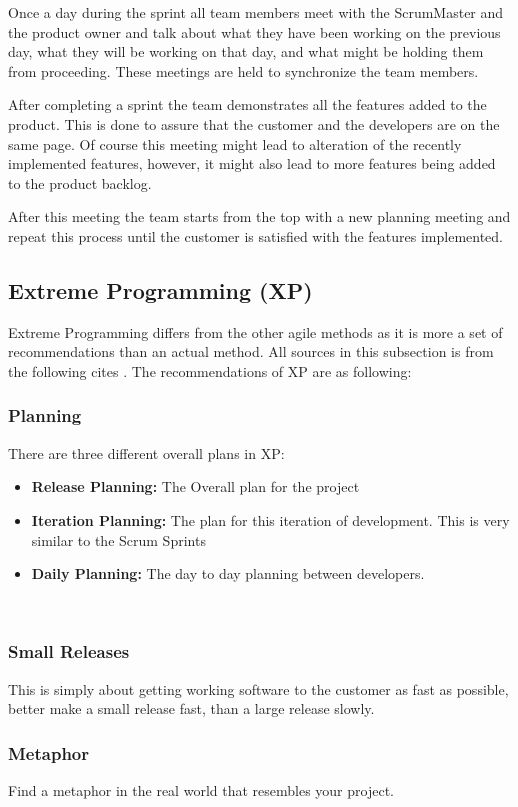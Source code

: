 Once a day during the sprint all team members meet with the ScrumMaster and the product owner and talk about what they have been working on the previous day, what they will be working on that day, and what might be holding them from proceeding. These meetings are held to synchronize the team members.

After completing a sprint the team demonstrates all the features added to the product. This is done to assure that the customer and the developers are on the same page.
Of course this meeting might lead to alteration of the recently implemented features, however, it might also lead to more features being added to the product backlog.

After this meeting the team starts from the top with a new planning meeting and repeat this process until the customer is satisfied with the features implemented.

\subsection{Extreme Programming (XP)}
Extreme Programming differs from the other agile methods as it is more a set of recommendations than an actual method. All sources in this subsection is from the following cites \cite{xp, xp2}.
The recommendations of XP are as following:

\subsubsection{Planning}
There are three different overall plans in XP:
\begin{itemize}
	\item \textbf{Release Planning:} The Overall plan for the project
	\item \textbf{Iteration Planning:} The plan for this iteration of development. This is very similar to the Scrum Sprints
	\item \textbf{Daily Planning:} The day to day planning between developers.
\end{itemize}
\ \\
\subsubsection{Small Releases}
This is simply about getting working software to the customer as fast as possible, better make a small release fast, than a large release slowly.

\subsubsection{Metaphor}
Find a metaphor in the real world that resembles your project.

